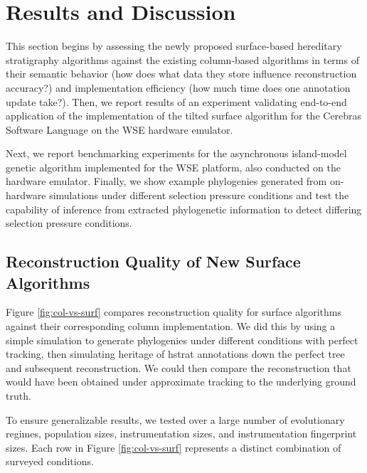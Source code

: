 \section{Results and Discussion} \label{sec:results}

This section begins by assessing the newly proposed surface-based hereditary stratigraphy algorithms against the existing column-based algorithms in terms of their semantic behavior (how does what data they store influence reconstruction accuracy?) and implementation efficiency (how much time does one annotation update take?).
Then, we report results of an experiment validating end-to-end application of the implementation of the tilted surface algorithm for the Cerebras Software Language on the WSE hardware emulator.

Next, we report benchmarking experiments for the asynchronous island-model genetic algorithm implemented for the WSE platform, also conducted on the hardware emulator.
Finally, we show example phylogenies generated from on-hardware simulations under different selection pressure conditions and test the capability of inference from extracted phylogenetic information to detect differing selection pressure conditions.

\subsection{Reconstruction Quality of New Surface Algorithms}



Figure \ref{fig:col-vs-surf} compares reconstruction quality for surface algorithms against their corresponding column implementation.
We did this by using a simple simulation to generate phylogenies under different conditions with perfect tracking, then simulating heritage of hstrat annotations down the perfect tree and subsequent reconstruction.
We could then compare the reconstruction that would have been obtained under approximate tracking to the underlying ground truth.

To ensure generalizable results, we tested over a large number of evolutionary regimes, population sizes, instrumentation sizes, and instrumentation fingerprint sizes.
Each row in Figure \ref{fig:col-vs-surf} represents a distinct combination of surveyed conditions.

